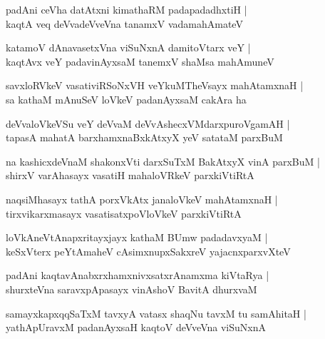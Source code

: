 \begin{shloka}
padAni ceVha datAtxni kimathaRM padapadadhxtiH |\\
kaqtA veq deVvadeVveVna tanamxV vadamahAmateV
\end{shloka}

\begin{shloka}
katamoV dAnavasetxVna viSuNxnA damitoVtarx veY |\\
kaqtAvx veY padavinAyxsaM tanemxV shaMsa mahAmuneV
\end{shloka}

\begin{shloka}
savxloRVkeV vasativiRSoNxVH veYkuMTheVsayx mahAtamxnaH |\\
sa kathaM mAnuSeV loVkeV padanAyxsaM cakAra ha
\end{shloka}

\begin{shloka}
deVvaloVkeVSu veY deVvaM deVvAshecxVMdarxpuroVgamAH |\\
tapasA mahatA barxhamxnaBxkAtxyX yeV satataM parxBuM
\end{shloka}

\begin{shloka}
na kashicxdeVnaM shakonxVti darxSuTxM BakAtxyX vinA parxBuM |\\
shirxV varAhasayx vasatiH mahaloVRkeV parxkiVtiRtA
\end{shloka}

\begin{shloka}
naqsiMhasayx tathA porxVkAtx janaloVkeV mahAtamxnaH |\\
tirxvikarxmasayx vasatisatxpoVloVkeV parxkiVtiRtA
\end{shloka}

\begin{shloka}
loVkAneVtAnapxritayxjayx kathaM BUmw padadavxyaM |\\
keSxVterx peYtAmaheV cAsimxnupxSakxreV yajacnxparxvXteV
\end{shloka}

\begin{shloka}
padAni kaqtavAnabxrxhamxnivxsatxrAnamxma kiVtaRya |\\
shurxteVna saravxpApasayx vinAshoV BavitA dhurxvaM
\end{shloka}

\begin{shloka}
samayxkapxqqSaTxM tavxyA vatasx shaqNu tavxM tu samAhitaH |\\
yathApUravxM padanAyxsaH kaqtoV deVveVna viSuNxnA 
\end{shloka}

